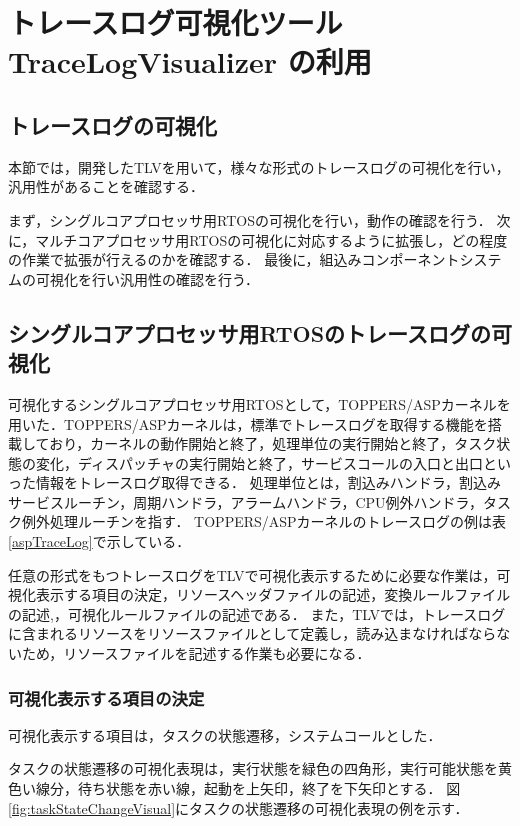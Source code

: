 \chapter{トレースログ可視化ツール TraceLogVisualizer の利用}

\section{トレースログの可視化}
本節では，開発したTLVを用いて，様々な形式のトレースログの可視化を行い，汎用性があることを確認する．

まず，シングルコアプロセッサ用RTOSの可視化を行い，動作の確認を行う．
次に，マルチコアプロセッサ用RTOSの可視化に対応するように拡張し，どの程度の作業で拡張が行えるのかを確認する．
最後に，組込みコンポーネントシステムの可視化を行い汎用性の確認を行う．
\fi

\section{シングルコアプロセッサ用RTOSのトレースログの可視化}
可視化するシングルコアプロセッサ用RTOSとして，TOPPERS/ASPカーネルを用いた．TOPPERS/ASPカーネルは，標準でトレースログを取得する機能を搭載しており，カーネルの動作開始と終了，処理単位の実行開始と終了，タスク状態の変化，ディスパッチャの実行開始と終了，サービスコールの入口と出口といった情報をトレースログ取得できる．
処理単位とは，割込みハンドラ，割込みサービスルーチン，周期ハンドラ，アラームハンドラ，CPU例外ハンドラ，タスク例外処理ルーチンを指す．
TOPPERS/ASPカーネルのトレースログの例は表\ref{aspTraceLog}で示している．

任意の形式をもつトレースログをTLVで可視化表示するために必要な作業は，可視化表示する項目の決定，リソースヘッダファイルの記述，変換ルールファイルの記述,，可視化ルールファイルの記述である．
また，TLVでは，トレースログに含まれるリソースをリソースファイルとして定義し，読み込まなければならないため，リソースファイルを記述する作業も必要になる．

\subsection{可視化表示する項目の決定}
\label{subsec414}

可視化表示する項目は，タスクの状態遷移，システムコールとした．

タスクの状態遷移の可視化表現は，実行状態を緑色の四角形，実行可能状態を黄色い線分，待ち状態を赤い線，起動を上矢印，終了を下矢印とする．
図\ref{fig:taskStateChangeVisual}にタスクの状態遷移の可視化表現の例を示す．

